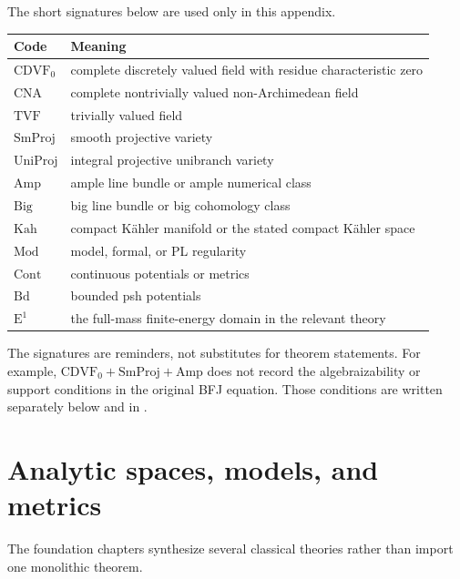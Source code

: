 The short signatures below are used only in this appendix.

\begin{center}
\begin{tabular}{@{}p{}p{}@{}}
\toprule
Code & Meaning \\
\midrule
\(\mathrm{CDVF}_0\)
  & complete discretely valued field with residue characteristic zero \\
\(\mathrm{CNA}\)
  & complete nontrivially valued non-Archimedean field \\
\(\mathrm{TVF}\)
  & trivially valued field \\
\(\mathrm{SmProj}\)
  & smooth projective variety \\
\(\mathrm{UniProj}\)
  & integral projective unibranch variety \\
\(\mathrm{Amp}\)
  & ample line bundle or ample numerical class \\
\(\mathrm{Big}\)
  & big line bundle or big cohomology class \\
\(\mathrm{Kah}\)
  & compact Kähler manifold or the stated compact Kähler space \\
\(\mathrm{Mod}\)
  & model, formal, or PL regularity \\
\(\mathrm{Cont}\)
  & continuous potentials or metrics \\
\(\mathrm{Bd}\)
  & bounded psh potentials \\
\(\mathrm E^1\)
  & the full-mass finite-energy domain in the relevant theory \\
\bottomrule
\end{tabular}
\end{center}

The signatures are reminders, not substitutes for theorem statements.
For example, \(\mathrm{CDVF}_0+\mathrm{SmProj}+\mathrm{Amp}\) does not record
the algebraizability or support conditions in the original BFJ equation.
Those conditions are written separately below and in
.

\section{Analytic spaces, models, and metrics}
\label{sec:appL-foundations}

The foundation chapters synthesize several classical theories rather than
import one monolithic theorem.

